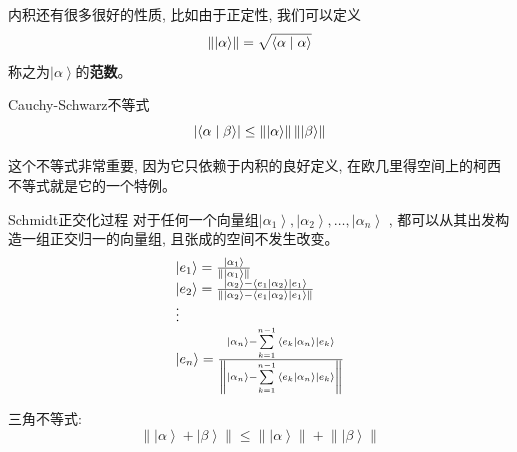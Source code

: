 内积还有很多很好的性质, 比如由于正定性, 我们可以定义\[\left\| {\left| \alpha  \right\rangle } \right\| = \sqrt {\left\langle {\alpha }
\mathrel{\left | {\vphantom {\alpha  \alpha }}\right. \kern-\nulldelimiterspace}{\alpha } \right\rangle } \]
称之为$\left| \alpha  \right\rangle $的\textbf{范数}。
\begin{theorem}{Cauchy-Schwarz不等式}
    \begin{equation}
        \left|\left\langle {\alpha }\mathrel{\left | {\vphantom {\alpha  \beta }}\right. \kern-\nulldelimiterspace}{\beta } \right\rangle \right| \le
        \left\| {\left| \alpha  \right\rangle } \right\|\left\| {\left| \beta  \right\rangle } \right\|
    \end{equation}
\end{theorem}
这个不等式非常重要, 因为它只依赖于内积的良好定义, 在欧几里得空间上的柯西不等式就是它的一个特例。
\begin{proposition}{Schmidt正交化过程}
    对于任何一个向量组${\left| {{\alpha _1}} \right\rangle  ,\left| {{\alpha _2}} \right\rangle  , \ldots,\left| {{\alpha _n}} \right\rangle }$
    , 都可以从其出发构造一组正交归一的向量组, 且张成的空间不发生改变。
    \[\begin{array}{l}
        \left| {{e_1}} \right\rangle  = \frac{{\left| {{\alpha _1}} \right\rangle }}{{\left\| {\left| {{\alpha _1}} \right\rangle } \right\|}}\\
        \left| {{e_2}} \right\rangle  = \frac{{\left| {{\alpha _2}} \right\rangle  - \left\langle {{{e_1}}}
         \mathrel{\left | {\vphantom {{{e_1}} {{\alpha _2}}}}
         \right. \kern-\nulldelimiterspace}
         {{{\alpha _2}}} \right\rangle \left| {{e_1}} \right\rangle }}{{\left\| {\left| {{\alpha _2}} \right\rangle  - \left\langle {{{e_1}}}
         \mathrel{\left | {\vphantom {{{e_1}} {{\alpha _2}}}}
         \right. \kern-\nulldelimiterspace}
         {{{\alpha _2}}} \right\rangle \left| {{e_1}} \right\rangle } \right\|}}\\
         \vdots \\
        \left| {{e_n}} \right\rangle  = \frac{{\left| {{\alpha _n}} \right\rangle  - \sum\limits_{k = 1}^{n - 1} {\left\langle {{{e_k}}}
         \mathrel{\left | {\vphantom {{{e_k}} {{\alpha _n}}}}
         \right. \kern-\nulldelimiterspace}
         {{{\alpha _n}}} \right\rangle \left| {{e_k}} \right\rangle } }}{{\left\| {\left| {{\alpha _n}} \right\rangle  - \sum\limits_{k = 1}^{n - 1} {\left\langle {{{e_k}}}
         \mathrel{\left | {\vphantom {{{e_k}} {{\alpha _n}}}}
         \right. \kern-\nulldelimiterspace}
         {{{\alpha _n}}} \right\rangle \left| {{e_k}} \right\rangle } } \right\|}}
        \end{array}\]
\end{proposition}
三角不等式:
\[\left\| {\left| \alpha  \right\rangle  + \left| \beta  \right\rangle } \right\| \le \left\| {\left| \alpha  \right\rangle } \right\| + \left\| {\left| \beta  \right\rangle } \right\|\]

